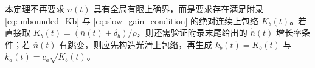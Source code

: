 \begin{remark}[关于无界扰动上界的实现]
    本定理不再要求 $\bar n(t)$ 具有全局有限上确界，而是要求存在满足附录 \eqref{eq:unbounded_Kb} 与 \eqref{eq:slow_gain_condition} 的绝对连续上包络 $K_b(t)$。若直接取 $K_b(t)=(\bar n(t)+\delta_b)/\rho$，则还需验证附录末尾给出的 $\dot{\bar n}(t)$ 增长率条件；若 $\bar n(t)$ 有跳变，则应先构造光滑上包络，再生成 $k_b(t)=K_b(t)$ 与 $k_a(t)=c_a\sqrt{K_b(t)}$。
\end{remark}
